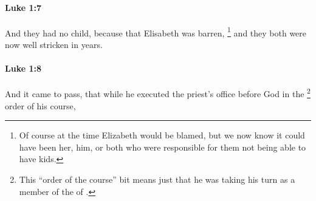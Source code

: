		\paragraph{Luke 1:7} %
			\label{LUKE-1-7}

			And they had no child, because that Elisabeth was barren,%
				\footnote{%
					Of course at the time Elizabeth would be blamed, but we now know it could have been her, him, or both who were responsible for them not being able to have kids.
					}
			and they both were now well stricken in years.

			\begin{framed}
			\scriptsize
				\begin{compactdesc}
					\item[SBLG] 
				\end{compactdesc}
			\end{framed}

		\paragraph{Luke 1:8} %
			\label{LUKE-1-8}

			And it came to pass, that while he executed the priest's office before God in the
				\footnote{%
					This ``order of the course'' bit means just that he was taking his turn as a member of the  of .
					}%
			order of his course,

